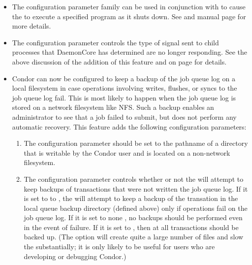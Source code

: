 \begin{itemize}
\item The configuration parameter family
   can be used in conjunction
  with  to cause the  to execute
  a specified program as it shuts down.  See
  \pageref{param:MasterShutdownProgram} and 
  manual page for more details.

\item The configuration parameter
   controls the type of signal
  sent to child processes that DaemonCore has determined are no longer
  responding.  See the above discussion of the addition of this
  feature and  on page
  \pageref{param:NotRespondingWantCore} for details.

\item Condor can now be configured to keep a backup of the job queue
  log on a local filesystem in case  operations
  involving writes, flushes, or syncs to the job queue log fail.  This
  is most likely to happen when the job queue log is stored on a
  network filesystem like NFS. Such a backup enables an administrator
  to see that a job failed to submit, but does not perform any
  automatic recovery.  This feature adds the following configuration
  parameters:
  \begin{enumerate}
  \item The configuration parameter 
    should be set to the pathname of a directory that is writable by
    the Condor user and is located on a non-network filesystem.
  \item The configuration parameter
     controls whether or not the
     will attempt to keep backups of transactions that
    were not written the job queue log.  If it is set to to
    , the  will attempt to keep a backup
    of the transation in the local queue backup directory (defined
    above) only if operations fail on the job queue log.  If it is set
    to none , no backups should be performed even in the
    event of failure.  If it is set to , then at all
    transactions should be backed up.  (The  option will
    create quite a large number of files and slow the 
    substantially; it is only likely to be useful for users who are
    developing or debugging Condor.)

  \end{enumerate}


\end{itemize}

